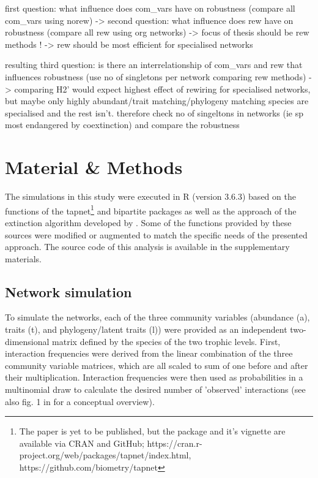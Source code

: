 \documentclass[12pt,a4paper]{article}
\begin{document}
first question: what influence does com_vars have on robustness (compare all com_vars using norew)
	-> 
second question: what influence does rew have on robustness (compare all rew using org networks) -> focus of thesis should be rew methods !
	-> rew should be most efficient for specialised networks
	
resulting third question: is there an interrelationship of com_vars and rew that influences robustness (use no of singletons per network comparing rew methods)
	-> comparing H2' would expect highest effect of rewiring for specialised networks, but maybe only highly abundant/trait matching/phylogeny matching species are specialised and the rest isn't. therefore check no of singeltons in networks (ie sp most endangered by coextinction) and compare the robustness 

\newpage

	\section{Material \& Methods}
	The simulations in this study were executed in R \parencite{Rcore} (version 3.6.3) based on the functions of the tapnet\footnote{The paper is yet to be published, but the package and it's vignette are available via CRAN and GitHub; https://cran.r-project.org/web/packages/tapnet/index.html, https://github.com/biometry/tapnet} \parencite{Benadi} and bipartite \parencite{Dormann2008} packages as well as the approach of the extinction algorithm developed by \citeauthor{Vizentin-Bugoni2019} \parencite{Vizentin-Bugoni2019}. Some of the functions provided by these sources were modified or augmented to match the specific needs of the presented approach. The source code of this analysis is available in the supplementary materials. \par



	\subsection{Network simulation} \label{sec:net_sim}
	To simulate the networks, each of the three community variables (abundance (a), traits (t), and phylogeny/latent traits (l)) were provided as an independent two-dimensional matrix defined by the species of the two trophic levels. First, interaction frequencies were derived from the linear combination of the three community variable matrices, which are all scaled to sum of one before and after their multiplication. Interaction frequencies were then used as probabilities in a multinomial draw to calculate the desired number of 'observed' interactions (see also fig. 1 in \cite{Benadi} for a conceptual overview). \par
\end{document}
